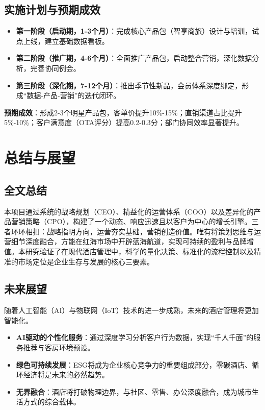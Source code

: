 \documentclass{cumcmthesis}
\begin{document}
\subsection{实施计划与预期成效}
\begin{itemize}
    \item \textbf{第一阶段（启动期，1-3个月）}：完成核心产品包（智享商旅）设计与培训，试点上线，建立基础数据看板。
    \item \textbf{第二阶段（推广期，4-6个月）}：全面推广产品包，启动整合营销，深化数据分析，完善协同例会。
    \item \textbf{第三阶段（深化期，7-12个月）}：推出季节性新品，会员体系深度绑定，形成“数据-产品-营销”的迭代闭环。
\end{itemize}
\textbf{预期成效}：形成2-3个明星产品包，客单价提升10\%-15\%；直销渠道占比提升5\%-10\%；客户满意度（OTA评分）提高0.2-0.3分；部门协同效率显著提升。

\section{总结与展望}

\subsection{全文总结}
本项目通过系统的战略规划（CEO）、精益化的运营体系（COO）以及差异化的产品营销策略（CPO），构建了一个动态、响应迅速且以客户为中心的增长引擎。三者环环相扣：战略指明方向，运营夯实基础，营销创造价值。唯有将策划思维与运营细节深度融合，方能在红海市场中开辟蓝海航道，实现可持续的盈利与品牌增值。本研究验证了在现代酒店管理中，科学的量化决策、标准化的流程控制以及精准的市场定位是企业生存与发展的核心三要素。

\subsection{未来展望}
随着人工智能（AI）与物联网（IoT）技术的进一步成熟，未来的酒店管理将更加智能化。
\begin{itemize}
    \item \textbf{AI驱动的个性化服务}：通过深度学习分析客户行为数据，实现“千人千面”的服务推荐与客房环境预设。
    \item \textbf{绿色可持续发展}：ESG将成为企业核心竞争力的重要组成部分，零碳酒店、循环经济将是未来的必然趋势。
    \item \textbf{无界融合}：酒店将打破物理边界，与社区、零售、办公深度融合，成为城市生活方式的综合载体。
\end{itemize}
\end{document}
